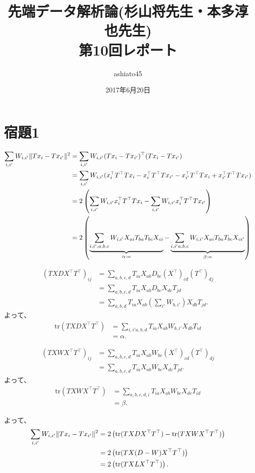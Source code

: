 \documentclass[9pt]{ltjsarticle}
\title{先端データ解析論(杉山将先生・本多淳也先生)\\第10回レポート}
\author{ashiato45}
\date{2017年6月20日}
\newcommand{\tr}{\mathrm{tr}}
\begin{document}
\maketitle

\section*{宿題1}
\begin{align}
\sum_{i,i'} W_{i,i'}\|Tx_i-T{x_{i'}}\|^2
&=
\sum_{i,i'} W_{i,i'}(Tx_i-T{x_{i'}})^\top (Tx_i-T{x_{i'}})\\
&=
\sum_{i,i'} W_{i,i'}(x_i^\top T^\top T x_i - x_i^\top T^\top T x_{i'} - x_{i'}^\top T^\top T x_i + x_{i'}^\top T^\top T x_{i'})\\
&=
2\left({\sum_{i,i'}W_{i,i'}x_i^\top T^\top T x_i} 
- {\sum_{i,i'}W_{i,i'}x_i^\top T^\top T x_{i'}}\right)\\
&=
2\left(\underbrace{\sum_{i,i',a,b,c}W_{i,i'} X_{ai}T_{ba}T_{bc}X_{ci}}_{\alpha :=} 
- \underbrace{\sum_{i,i'a,b,c}W_{i,i'}X_{ai}T_{ba}T_{bc}X_{ci'}}_{\beta :=}\right)\\
\end{align}

\begin{align}
(TXDX^\top T^\top)_{ij}
&=
\sum_{a,b,c,d}T_{ia}X_{ab}D_{bc}(X^\top)_{cd}(T^\top)_{dj}\\
&=
\sum_{a,b,c,d}T_{ia}X_{ab}D_{bc}X_{dc}T_{jd}\\
&=
\sum_{a,b,d}T_{ia}X_{ab}(\sum_{i'}W_{b,i'})X_{db}T_{jd}.
\end{align}
よって、
\begin{align}
\tr(TXDX^\top T^\top)
&=
\sum_{i,i'a,b,d}T_{ia}X_{ab}W_{b,i'}X_{db}T_{id}\\
&= \alpha.
\end{align}

\begin{align}
(TXWX^\top T^\top)_{ij}
&=
\sum_{a,b,c,d}T_{ia}X_{ab}W_{bc}(X^\top)_{cd}(T^\top)_{dj}\\
&=
\sum_{a,b,c,d}T_{ia}X_{ab}W_{bc}X_{dc}T_{jd}.
\end{align}
よって、
\begin{align}
\tr(TXWX^\top T^\top)
&=
\sum_{a,b,c,d,i}T_{ia}X_{ab}W_{bc}X_{dc}T_{id}\\
&=
\beta.
\end{align}

よって、
\begin{align}
\sum_{i,i'} W_{i,i'}\norm{Tx_i-T{x_{i'}}}^2
&=
2\left(\tr(TXDX^\top T^\top) - \tr(TXWX^\top T^\top)\right)\\
&=
2\left(\tr(TX(D-W)X^\top T^\top)\right)\\
&=
2\left(\tr(TXLX^\top T^\top)\right).
\end{align}
\end{document}
